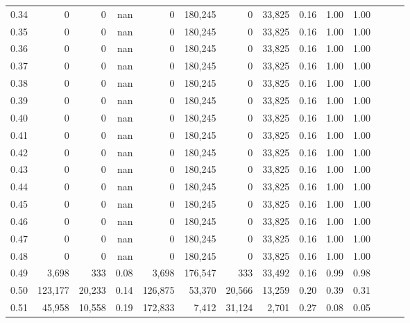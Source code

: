 \begin{tabular}{rrrrrrrrrrrrrr}
0.34 &        0 &       0 &   nan &        0 &  180,245 &       0 &  33,825 &  0.16 &  1.00 &      1.00 \\
0.35 &        0 &       0 &   nan &        0 &  180,245 &       0 &  33,825 &  0.16 &  1.00 &      1.00 \\
0.36 &        0 &       0 &   nan &        0 &  180,245 &       0 &  33,825 &  0.16 &  1.00 &      1.00 \\
0.37 &        0 &       0 &   nan &        0 &  180,245 &       0 &  33,825 &  0.16 &  1.00 &      1.00 \\
0.38 &        0 &       0 &   nan &        0 &  180,245 &       0 &  33,825 &  0.16 &  1.00 &      1.00 \\
0.39 &        0 &       0 &   nan &        0 &  180,245 &       0 &  33,825 &  0.16 &  1.00 &      1.00 \\
0.40 &        0 &       0 &   nan &        0 &  180,245 &       0 &  33,825 &  0.16 &  1.00 &      1.00 \\
0.41 &        0 &       0 &   nan &        0 &  180,245 &       0 &  33,825 &  0.16 &  1.00 &      1.00 \\
0.42 &        0 &       0 &   nan &        0 &  180,245 &       0 &  33,825 &  0.16 &  1.00 &      1.00 \\
0.43 &        0 &       0 &   nan &        0 &  180,245 &       0 &  33,825 &  0.16 &  1.00 &      1.00 \\
0.44 &        0 &       0 &   nan &        0 &  180,245 &       0 &  33,825 &  0.16 &  1.00 &      1.00 \\
0.45 &        0 &       0 &   nan &        0 &  180,245 &       0 &  33,825 &  0.16 &  1.00 &      1.00 \\
0.46 &        0 &       0 &   nan &        0 &  180,245 &       0 &  33,825 &  0.16 &  1.00 &      1.00 \\
0.47 &        0 &       0 &   nan &        0 &  180,245 &       0 &  33,825 &  0.16 &  1.00 &      1.00 \\
0.48 &        0 &       0 &   nan &        0 &  180,245 &       0 &  33,825 &  0.16 &  1.00 &      1.00 \\
0.49 &    3,698 &     333 &  0.08 &    3,698 &  176,547 &     333 &  33,492 &  0.16 &  0.99 &      0.98 \\
0.50 &  123,177 &  20,233 &  0.14 &  126,875 &   53,370 &  20,566 &  13,259 &  0.20 &  0.39 &      0.31 \\
0.51 &   45,958 &  10,558 &  0.19 &  172,833 &    7,412 &  31,124 &   2,701 &  0.27 &  0.08 &      0.05 \\

\end{tabular}
